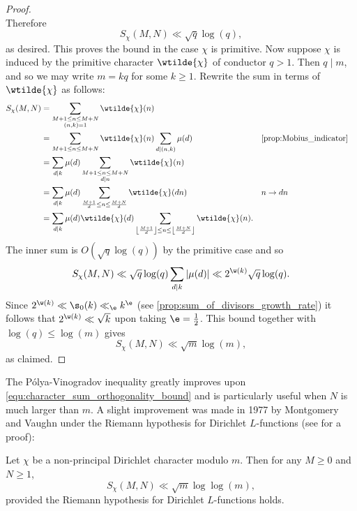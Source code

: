 \begin{proof}
\[      \]
      Therefore
      \[
        S_{\chi}(M,N) \ll \sqrt{q}\log(q),
      \]
      as desired. This proves the bound in the case \(\chi\) is primitive. Now suppose \(\chi\) is induced by the primitive character \(\wtilde{\chi}\) of conductor \(q > 1\). Then \(q \mid m\), and so we may write \(m = kq\) for some \(k \ge 1\). Rewrite the sum in terms of \(\wtilde{\chi}\) as follows:
      \begin{align*}
        S_{\chi}(M,N) &= \sum_{\substack{M+1 \le n \le M+N \\ (n,k) = 1}}\wtilde{\chi}(n) \\
        &= \sum_{M+1 \le n \le M+N}\wtilde{\chi}(n)\sum_{d \mid (n,k)}\mu(d) && \text{\cref{prop:Mobius_indicator}} \\
        &= \sum_{d \mid k}\mu(d)\sum_{\substack{M+1 \le n \le M+N \\ d \mid n}}\wtilde{\chi}(n) \\
        &= \sum_{d \mid k}\mu(d)\sum_{\frac{M+1}{d} \le n \le \frac{M+N}{d}}\wtilde{\chi}(dn) && \text{\(n \to dn\)} \\
        &= \sum_{d \mid k}\mu(d)\wtilde{\chi}(d)\sum_{\left\lfloor\frac{M+1}{d}\right\rfloor \le n \le \left\lfloor\frac{M+N}{d}\right\rfloor}\wtilde{\chi}(n).
      \end{align*}
      The inner sum is \(O(\sqrt{q}\log(q))\) by the primitive case and so
      \[
        S_{\chi}(M,N) \ll \sqrt{q}\log(q)\sum_{d \mid k}|\mu(d)| \ll 2^{\w(k)}\sqrt{q}\log(q).
      \]
      Since \(2^{\w(k)} \ll \s_{0}(k) \ll_{\e} k^{\e}\) (see \cref{prop:sum_of_divisors_growth_rate}) it follows that \(2^{\w(k)} \ll \sqrt{k}\) upon taking \(\e = \frac{1}{2}\). This bound together with \(\log(q) \le \log(m)\) gives
      \[
        S_{\chi}(M,N) \ll \sqrt{m}\log(m),
      \]
      as claimed.
    \end{proof}

    The P\'olya-Vinogradov inequality greatly improves upon \cref{equ:character_sum_orthogonality_bound} and is particularly useful when \(N\) is much larger than \(m\). A slight improvement was made in 1977 by Montgomery and Vaughn under the Riemann hypothesis for Dirichlet \(L\)-functions (see \cite{montgomery1977exponential} for a proof):

    \begin{theorem}\label{thm:MV_bound_character_sum}
      Let \(\chi\) be a non-principal Dirichlet character modulo \(m\). Then for any \(M \ge 0\) and \(N \ge 1\),
      \[
        S_{\chi}(M,N) \ll \sqrt{m}\log{\log(m)},
      \]
      provided the Riemann hypothesis for Dirichlet \(L\)-functions holds.
    \end{theorem}
    
